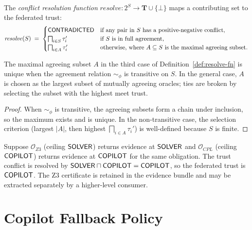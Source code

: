 \documentclass[11pt]{article}
\newcommand{\Oracle}{\mathcal{O}}            %
\newcommand{\Orcl}[1]{\Oracle_{#1}}         %
\newcommand{\tmin}{\sqcap}                   %
\newcommand{\tmeet}[2]{#1 \tmin #2}          %
\newcommand{\TierSet}{\mathbf{T}}           %
\begin{document}
\begin{definition}\label{def:resolve-fn}
  The \emph{conflict resolution function} $\mathit{resolve} : 2^S \to
  \TierSet \cup \{\bot\}$ maps a contributing set to the federated trust:
  \[
    \mathit{resolve}(S) \;=\;
    \begin{cases}
      \mathsf{CONTRADICTED} & \text{if any pair in } S \text{ has a
                  positive-negative conflict},\\
      \bigsqcap_{i \in S} \tau_i' & \text{if } S \text{ is in full
                                     agreement},\\
      \bigsqcap_{i \in A} \tau_i' & \text{otherwise, where }
                                     A \subseteq S
                                     \text{ is the maximal agreeing
                                     subset}.
    \end{cases}
  \]
\end{definition}

\begin{proposition}\label{prop:resolve-welldef}
  The maximal agreeing subset $A$ in the third case of
  Definition~\ref{def:resolve-fn} is unique when the agreement relation
  $\sim_\phi$ is transitive on $S$.  In the general case, $A$ is chosen
  as the largest subset of mutually agreeing oracles; ties are broken by
  selecting the subset with the highest meet trust.
\end{proposition}
\begin{proof}
  When $\sim_\phi$ is transitive, the agreeing subsets form a chain under
  inclusion, so the maximum exists and is unique.  In the non-transitive
  case, the selection criterion (largest $|A|$, then highest
  $\bigsqcap_{i \in A} \tau_i'$) is well-defined because $S$ is finite.
\end{proof}

\begin{example}
  Suppose $\Orcl{Z3}$ (ceiling $\mathsf{SOLVER}$) returns evidence at
  $\mathsf{SOLVER}$ and $\Orcl{CPL}$ (ceiling $\mathsf{COPILOT}$) returns evidence at
  $\mathsf{COPILOT}$ for the same obligation.  The trust conflict is resolved
  by $\tmeet{\Tsolver}{\Tcopilot} = \Tcopilot$, so the federated trust
  is $\mathsf{COPILOT}$.  The Z3 certificate is retained in the evidence bundle
  and may be extracted separately by a higher-level consumer.
\end{example}

\section{Copilot Fallback Policy}\label{sec:copilot}
\end{document}
